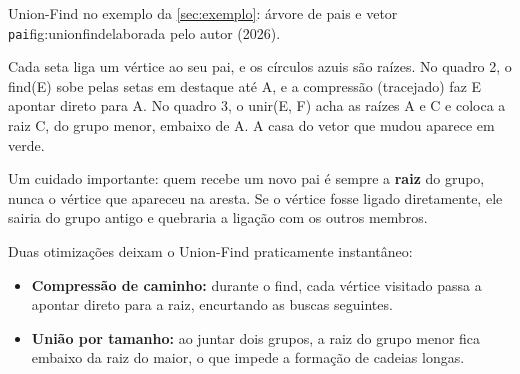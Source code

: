 \documentclass[a4paper]{article}
\begin{document}
\begin{figura}{Union-Find no exemplo da \cref{sec:exemplo}: árvore de pais e vetor \texttt{pai}}{fig:unionfind}{elaborada pelo autor (2026).}
{}
\end{figura}

Cada seta liga um vértice ao seu pai, e os círculos azuis são raízes. No
quadro 2, o find(E) sobe pelas setas em destaque até A, e a compressão
(tracejado) faz E apontar direto para A. No quadro 3, o unir(E, F) acha as raízes
A e C e coloca a raiz C, do grupo menor, embaixo de A. A casa do vetor que mudou
aparece em verde.

Um cuidado importante: quem recebe um novo pai é sempre a \textbf{raiz} do grupo,
nunca o vértice que apareceu na aresta. Se o vértice fosse ligado diretamente,
ele sairia do grupo antigo e quebraria a ligação com os outros membros.

Duas otimizações deixam o Union-Find praticamente instantâneo:
\begin{itemize}
    \item \textbf{Compressão de caminho:} durante o find, cada vértice visitado
    passa a apontar direto para a raiz, encurtando as buscas seguintes.
    \item \textbf{União por tamanho:} ao juntar dois grupos, a raiz do grupo menor
    fica embaixo da raiz do maior, o que impede a formação de cadeias longas.
\end{itemize}
\end{document}
